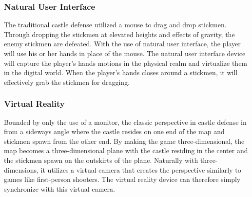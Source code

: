 \subsubsection{Natural User Interface}

The traditional castle defense utilized a mouse to drag and drop stickmen. Through dropping the stickmen at elevated heights and effects of gravity, the enemy stickmen are defeated. With the use of natural user interface, the player will use his or her hands in place of the mouse. The natural user interface device will capture the player's hands motions in the physical realm and virtualize them in the digital world. When the player's hands closes around a stickmen, it will effectively grab the stickmen for dragging. 

\subsubsection{Virtual Reality}

Bounded by only the use of a monitor, the classic perspective in castle defense in from a sideways angle where the castle resides on one end of the map and stickmen spawn from the other end. By making the game three-dimensional, the map becomes a three-dimensional plane with the castle residing in the center and the stickmen spawn on the outskirts of the plane. Naturally with three-dimensions, it utilizes a virtual camera that creates the perspective similarly to games like first-person shooters. The virtual reality device can therefore simply synchronize with this virtual camera. 


